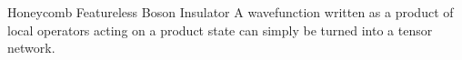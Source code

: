 \begin{frame}{Honeycomb Featureless Boson Insulator}
\vskip-1.5cm
A wavefunction written as a product of local operators acting on a product state can simply be turned into a tensor network.


\end{frame}